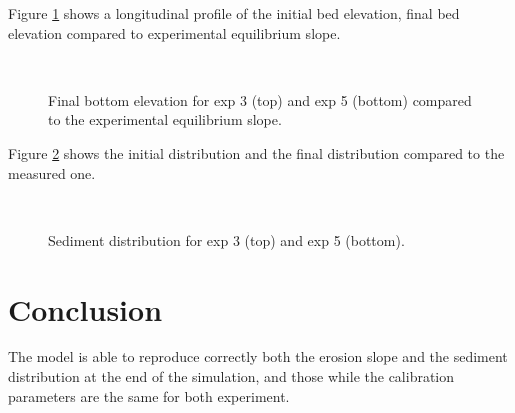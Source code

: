 Figure \ref{guenter-t2d:fig:profile} shows a longitudinal profile of the initial bed elevation, final bed elevation compared to experimental equilibrium slope.

\begin{figure}[H]
 \centering
 \\
 \caption{Final bottom elevation for exp 3 (top) and exp 5 (bottom) compared to the experimental equilibrium slope.}
 \label{guenter-t2d:fig:profile}
\end{figure}

Figure \ref{guenter-t2d:fig:distrib} shows the initial distribution and the final distribution compared to the measured one.

\begin{figure}[H]
 \centering
 \\
 \caption{Sediment distribution for exp 3 (top) and exp 5 (bottom).}
 \label{guenter-t2d:fig:distrib}
\end{figure}

%
\section{Conclusion}

The model is able to reproduce correctly both the erosion slope and the sediment distribution at the end of the simulation, and those while the calibration parameters are the same for both experiment.

